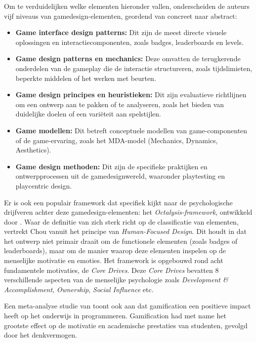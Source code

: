 Om te verduidelijken welke elementen hieronder vallen, onderscheiden de auteurs vijf niveaus van gamedesign-elementen, geordend van concreet naar abstract:
\begin{itemize} 
    \item \textbf{Game interface design patterns:} Dit zijn de meest directe visuele oplossingen en interactiecomponenten, zoals badges, leaderboards en levels. 
    \item \textbf{Game design patterns en mechanics:} Deze omvatten de terugkerende onderdelen van de gameplay die de interactie structureren, zoals tijdslimieten, beperkte middelen of het werken met beurten. 
    \item \textbf{Game design principes en heuristieken:} Dit zijn evaluatieve richtlijnen om een ontwerp aan te pakken of te analyseren, zoals het bieden van duidelijke doelen of een variëteit aan spelstijlen. 
    \item \textbf{Game modellen:} Dit betreft conceptuele modellen van game-componenten of de game-ervaring, zoals het MDA-model (Mechanics, Dynamics, Aesthetics). 
    \item \textbf{Game design methoden:} Dit zijn de specifieke praktijken en ontwerpprocessen uit de gamedesignwereld, waaronder playtesting en playcentric design.
\end{itemize}

Er is ook een populair framework dat specifiek kijkt naar de psychologische drijfveren achter deze gamedesign-\allowbreak elementen: het \textit{Octalysis-\allowbreak framework}, ontwikkeld door \textcite{Chou2015}. 
Waar de definitie van \textcite{Deterding2011} zich sterk richt op de classificatie van elementen, vertrekt Chou vanuit het principe van \textit{Human-Focused Design}.
Dit houdt in dat het ontwerp niet primair draait om de functionele elementen (zoals badges of leaderboards), maar om de manier waarop deze elementen inspelen op de menselijke motivatie en emoties.
Het framework is opgebouwd rond acht fundamentele motivaties, de \textit{Core Drives}. 
Deze \textit{Core Drives} bevatten 8 verschillende aspecten van de menselijke psychologie zoals \textit{Development \& Accomplishment}, \textit{Ownership}, \textit{Social Influence} etc. \autocite{Chou2015}

Een meta-analyse studie van \textcite{Zhan2022} toont ook aan dat gamification een positieve impact heeft op het onderwijs in programmeren. 
Gamification had met name het grootste effect op de motivatie en academische prestaties van studenten, gevolgd door het denkvermogen.


